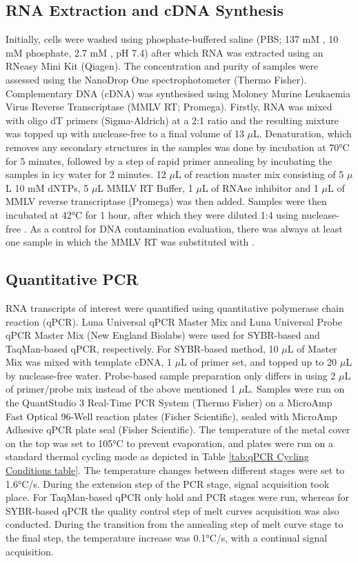 \subsection{RNA Extraction and cDNA Synthesis} \label{subsec:RNA Extraction and cDNA Synthesis}
Initially, cells were washed using phosphate-buffered saline (PBS; 137 mM , 10 mM phosphate, 2.7 mM , pH 7.4) after which RNA was extracted using an RNeasy Mini Kit (Qiagen). The concentration and purity of samples were assessed using the NanoDrop One spectrophotometer (Thermo Fisher). Complementary DNA (cDNA) was synthesised using Moloney Murine Leukaemia Virus Reverse Transcriptase (MMLV RT; Promega). Firstly, RNA was mixed with oligo dT primers (Sigma-Aldrich) at a 2:1 ratio and the resulting mixture was topped up with nuclease-free  to a final volume of 13 \(\mu\)L. Denaturation, which removes any secondary structures in the samples was done by incubation at 70°C for 5 minutes, followed by a step of rapid primer annealing by incubating the samples in icy water for 2 minutes. 12 \(\mu\)L of reaction master mix consisting of 5 \(\mu\)L 10 mM dNTPs, 5 \(\mu\)L MMLV RT Buffer, 1 \(\mu\)L of RNAse inhibitor and 1 \(\mu\)L of MMLV reverse transcriptase (Promega) was then added. Samples were then incubated at 42°C for 1 hour, after which they were diluted 1:4 using nuclease-free . As a control for DNA contamination evaluation, there was always at least one sample in which the MMLV RT was substituted with .




\subsection{Quantitative PCR} \label{subsec:Quantitative PCR}
RNA transcripts of interest were quantified using quantitative polymerase chain reaction (qPCR). Luna Universal qPCR Master Mix and Luna Universal Probe qPCR Master Mix (New England Biolabs) were used for SYBR-based and TaqMan-based qPCR, respectively. For SYBR-based method, 10 \(\mu\)L of Master Mix was mixed with template cDNA, 1 \(\mu\)L of primer set, and topped up to 20 \(\mu\)L by nuclease-free water. Probe-based sample preparation only differs in using 2 \(\mu\)L of primer/probe mix instead of the above mentioned 1 \(\mu\)L. Samples were run on the QuantStudio 3 Real-Time PCR System (Thermo Fisher) on a MicroAmp Fast Optical 96-Well reaction plates (Fisher Scientific), sealed with MicroAmp Adhesive qPCR plate seal (Fisher Scientific). The temperature of the metal cover on the top was set to 105°C to prevent evaporation, and plates were run on a standard thermal cycling mode as depicted in Table \ref{tab:qPCR Cycling Conditions table}. The temperature changes between different stages were set to 1.6°C/s. During the extension step of the PCR stage, signal acquisition took place. For TaqMan-based qPCR only hold and PCR stages were run, whereas for SYBR-based qPCR the quality control step of melt curves acquisition was also conducted. During the transition from the annealing step of melt curve stage to the final step, the temperature increase was 0.1°C/s, with a continual signal acquisition.

